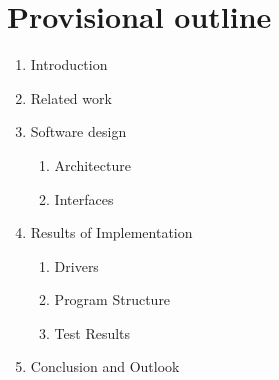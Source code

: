 %
%

\chapter{Provisional outline}
\label{chap:Provisional outline}
%
\begin{enumerate}[label=\Roman*.]
	\item Introduction
	\item Related work
	\item Software design
	\begin{enumerate}[label=\Alph*.]
		\item Architecture
		\item Interfaces
	\end{enumerate}
	\item Results of Implementation
	\begin{enumerate}[label=\Alph*.]
		\item Drivers
		\item Program Structure
		\item Test Results
	\end{enumerate}
	\item Conclusion and Outlook
\end{enumerate}